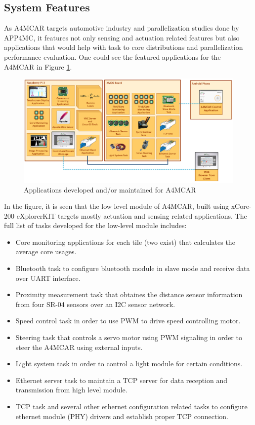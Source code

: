 \subsection{System Features}
As A4MCAR targets automotive industry and parallelization studies done by APP4MC, it features not only sensing and actuation related features but also applications that would help with task to core distributions and parallelization performance evaluation. One could see the featured applications for the A4MCAR in Figure \ref{fig:tasksoverall}. 
\begin{figure}[!ht]
	\includegraphics[scale=0.3]{content/images/tasksoverall.png}
	\caption{Applications developed and/or maintained for A4MCAR}
	\label{fig:tasksoverall}
\end{figure}
In the figure, it is seen that the low level module of A4MCAR, built using xCore-200 eXplorerKIT targets mostly actuation and sensing related applications. The full list of tasks developed for the low-level module includes:
\begin{itemize}
	\item Core monitoring applications for each tile (two exist) that calculates the average core usages.
	\item Bluetooth task to configure bluetooth module in slave mode and receive data over UART interface.
	\item Proximity measurement task that obtaines the distance sensor information from four SR-04 sensors over an I2C sensor network.
	\item Speed control task in order to use PWM to drive speed controlling motor.
	\item Steering task that controls a servo motor using PWM signaling in order to steer the A4MCAR using external inputs.
	\item Light system task in order to control a light module for certain conditions.
	\item Ethernet server task to maintain a TCP server for data reception and transmission from high level module.
	\item TCP task and several other ethernet configuration related tasks to configure ethernet module (PHY) drivers and establish proper TCP connection.
\end{itemize}
